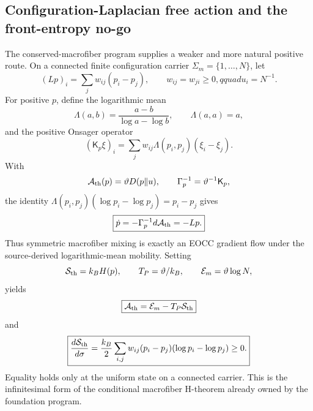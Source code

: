 \documentclass[11pt]{article}
\begin{document}
\subsection{Configuration-Laplacian free action and the front-entropy no-go}

The conserved-macrofiber program supplies a weaker and more natural positive
route.  On a connected finite configuration carrier
$\Sigma_m=\{1,\ldots,N\}$, let
\begin{equation}
 (Lp)_i=\sum_jw_{ij}(p_i-p_j),\qquad
 w_{ij}=w_{ji}\ge0,qquad u_i=N^{-1}.
 \label{eq:configuration-laplacian}
\end{equation}
For positive $p$, define the logarithmic mean
\begin{equation}
 \Lambda(a,b)=\frac{a-b}{\log a-\log b},\qquad
 \Lambda(a,a)=a,
 \label{eq:logarithmic-mean}
\end{equation}
and the positive Onsager operator
\begin{equation}
 (\mathsf K_p\xi)_i
 =\sum_jw_{ij}\Lambda(p_i,p_j)(\xi_i-\xi_j).
 \label{eq:onsager-operator}
\end{equation}
With
\begin{equation}
 \mathcal A_{\rm th}(p)=\vartheta D(p\Vert u),\qquad
 \Gamma_p^{-1}=\vartheta^{-1}\mathsf K_p,
 \label{eq:thermal-occurrence-action}
\end{equation}
the identity
$\Lambda(p_i,p_j)(\log p_i-\log p_j)=p_i-p_j$ gives
\begin{equation}
 \boxed{\dot p=-\Gamma_p^{-1}d\mathcal A_{\rm th}=-Lp.}
 \label{eq:laplacian-eocc}
\end{equation}
Thus symmetric macrofiber mixing is exactly an EOCC gradient flow under the
source-derived logarithmic-mean mobility.  Setting
\begin{equation}
 \mathcal S_{\rm th}=k_BH(p),\qquad
 T_P=\vartheta/k_B,\qquad
 \mathcal E_m=\vartheta\log N,
 \label{eq:thermal-terminals}
\end{equation}
yields
\begin{equation}
 \boxed{\mathcal A_{\rm th}=\mathcal E_m-T_P\mathcal S_{\rm th}}
 \label{eq:derived-free-action}
\end{equation}
and
\begin{equation}
 \boxed{
 \frac{d\mathcal S_{\rm th}}{d\sigma}
 =\frac{k_B}{2}\sum_{i,j}w_{ij}(p_i-p_j)
 (\log p_i-\log p_j)\ge0.}
 \label{eq:laplacian-entropy-production}
\end{equation}
Equality holds only at the uniform state on a connected carrier.  This is the
infinitesimal form of the conditional macrofiber H-theorem already owned by
the foundation program.
\end{document}
